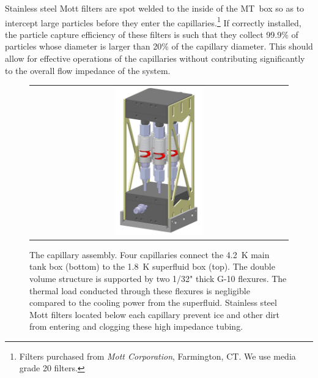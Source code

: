 \documentclass[
12pt, %
letterpaper, %
oneside, %
headinclude, footinclude, %
BCOR5mm, %
]{scrartcl}
\begin{document}
Stainless steel Mott filters are spot welded to the inside of the
MT~box so as to intercept large particles before they enter the
capillaries.\footnote{Filters purchased from \textit{Mott Corporation}, 
Farmington, CT. We use media grade 20 filters.}  
If correctly installed, the
particle capture efficiency of these filters is such that they collect
99.9\% of particles whose diameter is larger than 20\% of the
capillary diameter. This should allow for effective operations of the
capillaries without contributing significantly to the overall flow
impedance of the system.

\begin{figure}[t]
\begin{center}
\begin{tabular}{c}
\includegraphics[width = 0.35\textwidth]{img/capassy_vertical3.jpg}
\end{tabular}
\end{center}
\caption[example]
{ \label{fig:cap} The capillary assembly. Four capillaries connect the 4.2~K main tank box (bottom) to the 1.8~K superfluid box (top). The double volume structure is supported by two 1/32" thick G-10 flexures. The thermal load conducted through these flexures is negligible compared to the cooling power from the superfluid. Stainless steel Mott filters located below each capillary prevent ice and other dirt from entering and clogging these high impedance tubing.}
\end{figure}
\end{document}
